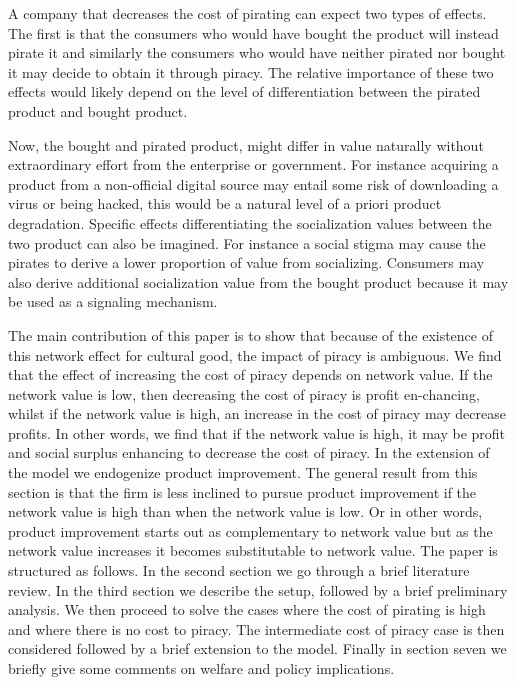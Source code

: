 A company that decreases the cost of pirating can expect two types of effects. The first is that the consumers who would have bought the product will instead pirate it and similarly the consumers who would have neither pirated nor bought it may decide to obtain it through piracy. The relative importance of these two effects would likely depend on the level of differentiation between the pirated product and bought product.

Now, the bought and pirated product, might differ in value naturally without extraordinary effort from the enterprise or government. For instance acquiring a product from a non-official digital source may entail some risk of downloading a virus or being hacked, this would be a natural level of a priori product degradation. Specific effects differentiating the socialization values between the two product can also be imagined. For instance a social stigma may cause the pirates to derive a lower proportion of value from socializing. Consumers may also derive additional socialization value from the bought product because it may be used as a signaling mechanism.

The main contribution of this paper is to show that because of the existence of this network effect for cultural good, the impact of piracy is ambiguous. We find that the effect of increasing the cost of piracy depends on network value. If the network value is low, then decreasing the cost of piracy is profit en-chancing, whilst if the network value is high, an increase in the cost of piracy may decrease profits. In other words, we find that if the network value is high, it may be profit and social surplus enhancing to decrease the cost of piracy. In the extension of the model we endogenize product improvement. The general result from this section is that the firm is less inclined to pursue product improvement if the network value is high than when the network value is low. Or in other words, product improvement starts out as complementary to network value but as the network value increases it becomes substitutable to network value.  The paper is structured as follows. In the second section we go through a brief literature review. In the third section we describe the setup, followed by a brief preliminary analysis. We then proceed to solve the cases where the cost of pirating is high and where there is no cost to piracy. The intermediate cost of piracy case is then considered followed by a brief extension to the model. Finally in section seven we briefly give some comments on welfare and policy implications.

